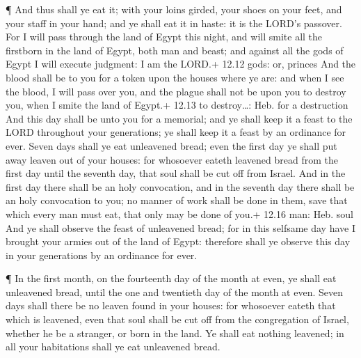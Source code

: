  ¶ And thus shall ye eat it; with your loins girded, your
shoes on your feet, and your staff in your hand; and ye shall eat it in
haste: it is the LORD's passover.  For I will pass through
the land of Egypt this night, and will smite all the firstborn in the
land of Egypt, both man and beast; and against all the gods of Egypt I
will execute judgment: I am the LORD.+ 12.12 gods: or, princes
 And the blood shall be to you for a token upon the houses
where ye are: and when I see the blood, I will pass over you, and the
plague shall not be upon you to destroy you, when I smite the land of
Egypt.+ 12.13 to destroy\ldots: Heb. for a destruction  And
this day shall be unto you for a memorial; and ye shall keep it a feast
to the LORD throughout your generations; ye shall keep it a feast by an
ordinance for ever.  Seven days shall ye eat unleavened
bread; even the first day ye shall put away leaven out of your houses:
for whosoever eateth leavened bread from the first day until the seventh
day, that soul shall be cut off from Israel.  And in the
first day there shall be an holy convocation, and in the seventh day
there shall be an holy convocation to you; no manner of work shall be
done in them, save that which every man must eat, that only may be done
of you.+ 12.16 man: Heb. soul  And ye shall observe the
feast of unleavened bread; for in this selfsame day have I brought your
armies out of the land of Egypt: therefore shall ye observe this day in
your generations by an ordinance for ever.

 ¶ In the first month, on the fourteenth day of the month
at even, ye shall eat unleavened bread, until the one and twentieth day
of the month at even.  Seven days shall there be no leaven
found in your houses: for whosoever eateth that which is leavened, even
that soul shall be cut off from the congregation of Israel, whether he
be a stranger, or born in the land.  Ye shall eat nothing
leavened; in all your habitations shall ye eat unleavened bread.

